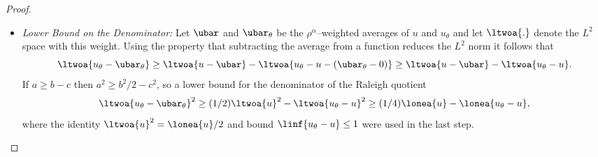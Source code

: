 \begin{proof}
\begin{itemize}
\item {\em Lower Bound on the Denominator:} Let $\ubar$ and
  $\ubar_\theta$ be the $\rho^\alpha$--weighted averages of $u$ and
  $u_\theta$ and let $\ltwoa{.}$ denote the $L^2$ space with this
  weight. Using the property that subtracting the average from a
  function reduces the $L^2$ norm it follows that
  $$
  \ltwoa{u_\theta - \ubar_\theta}
  \geq \ltwoa{u-\ubar} - \ltwoa{u_\theta - u - (\ubar_\theta-0)}
  \geq \ltwoa{u-\ubar} - \ltwoa{u_\theta - u}.
  $$
  If $a \geq b-c$ then $a^2 \geq b^2/2 - c^2$, so a lower bound for
  the denominator of the Raleigh quotient
  \begin{equation} \label{eqn:Autmu}
    \ltwoa{u_\theta - \ubar_\theta}^2
    \geq (1/2) \ltwoa{u}^2 - \ltwoa{u_\theta - u}^2
    \geq (1/4) \lonea{u} - \lonea{u_\theta - u},
  \end{equation}
  where the identity $\ltwoa{u}^2 = \lonea{u}/2$ and bound
  $\linf{u_\theta - u} \leq 1$ were used in the last step.


\end{itemize}
\end{proof}
